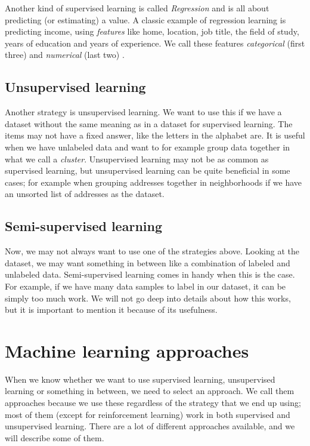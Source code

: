 Another kind of supervised learning is called \textit{Regression} and is all about predicting (or estimating) a value. A classic example of regression 
learning is predicting income, using \textit{features} like home, location, job title, the field of study,  years of education and years of experience. 
We call these features \textit{categorical} (first three) and \textit{numerical} (last two) \cite{machine_learning_for_humans_supervised_1}. 

\subsection{Unsupervised learning}
Another strategy is unsupervised learning. We want to use this if we have a dataset without the same meaning as in a dataset for supervised learning. 
The items may not have a fixed answer, like the letters in the alphabet are. It is useful when we have unlabeled data and want to for example group data 
together in what we call a \textit{cluster}. Unsupervised learning may not be as common as supervised learning, but unsupervised learning can be quite 
beneficial in some cases; for example when grouping addresses together in neighborhoods if we have an unsorted list of addresses as the dataset.

\subsection{Semi-supervised learning}
Now, we may not always want to use one of the strategies above. Looking at the dataset, we may want something in between like a combination of labeled and unlabeled data. 
Semi-supervised learning comes in handy when this is the case. For example, if we have many data samples to label in our dataset, it can be simply too much work. 
We will not go deep into details about how this works, but it is important to mention it because of its usefulness.


\section{Machine learning approaches}
When we know whether we want to use supervised learning, unsupervised learning or something in between, we need to select an approach. We call them 
approaches because we use these regardless of the strategy that we end up using; most of them (except for reinforcement learning) work in both 
supervised and unsupervised learning. There are a lot of different approaches available, and we will describe some of them.


